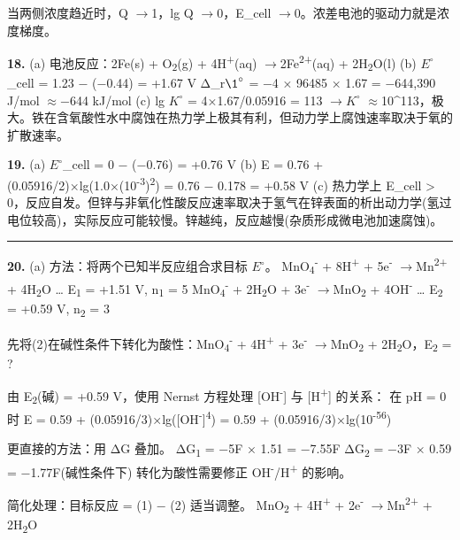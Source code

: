 \documentclass[a4paper,11pt]{ctexart}
\newcommand{\箭}{\ensuremath{\rightarrow}}
\newcommand{\左箭}{\ensuremath{\leftarrow}}
\newcommand{\上箭}{\ensuremath{\uparrow}}
\newcommand{\下箭}{\ensuremath{\downarrow}}
\newcommand{\衡}{\ensuremath{\rightleftharpoons}}
\newcommand{\双箭}{\ensuremath{\leftrightarrow}}
\newcommand{\约等于}{\ensuremath{\approx}}
\newcommand{\小于等于}{\ensuremath{\leq}}
\newcommand{\大于等于}{\ensuremath{\geq}}
\newcommand{\不等于}{\ensuremath{\neq}}
\newcommand{\西格马}{\ensuremath{\sigma}}
\newcommand{\派}{\ensuremath{\pi}}
\begin{document}
当两侧浓度趋近时，Q \箭 1，lg Q \箭 0，E\_cell \箭 0。浓差电池的驱动力就是浓度梯度。

\textbf{18.}
(a) 电池反应：2Fe(s) + O\textsubscript{2}(g) + 4H\textsuperscript{+}(aq) \箭 2Fe\textsuperscript{2+}(aq) + 2H\textsubscript{2}O(l)
(b) \(E^{\circ}\)\_cell = 1.23 − (−0.44) = +1.67 V
Δ\_r\(\1^{\circ}\) = −4 × 96485 × 1.67 = −644,390 J/mol \约等于 −644 kJ/mol
(c) lg \(K^{\circ}\) = 4×1.67/0.05916 = 113 \箭 \(K^{\circ}\) \约等于 10\^{}113，极大。铁在含氧酸性水中腐蚀在热力学上极其有利，但动力学上腐蚀速率取决于氧的扩散速率。

\textbf{19.}
(a) \(E^{\circ}\)\_cell = 0 − (−0.76) = +0.76 V
(b) E = 0.76 + (0.05916/2)×lg(1.0×(10\textsuperscript{-3})\textsuperscript{2}) = 0.76 − 0.178 = +0.58 V
(c) 热力学上 E\_cell \textgreater{} 0，反应自发。但锌与非氧化性酸反应速率取决于氢气在锌表面的析出动力学(氢过电位较高)，实际反应可能较慢。锌越纯，反应越慢(杂质形成微电池加速腐蚀)。

\begin{center}\rule{0.5\linewidth}{0.5pt}\end{center}

\textbf{20.}
(a) 方法：将两个已知半反应组合求目标 \(E^{\circ}\)。
MnO\textsubscript{4}\textsuperscript{-} + 8H\textsuperscript{+} + 5e\textsuperscript{-} \箭 Mn\textsuperscript{2+} + 4H\textsubscript{2}O \ldots{} E\textsubscript{1} = +1.51 V, n\textsubscript{1} = 5
MnO\textsubscript{4}\textsuperscript{-} + 2H\textsubscript{2}O + 3e\textsuperscript{-} \箭 MnO\textsubscript{2} + 4OH\textsuperscript{-} \ldots{} E\textsubscript{2} = +0.59 V, n\textsubscript{2} = 3

先将(2)在碱性条件下转化为酸性：MnO\textsubscript{4}\textsuperscript{-} + 4H\textsuperscript{+} + 3e\textsuperscript{-} \箭 MnO\textsubscript{2} + 2H\textsubscript{2}O，E\textsubscript{2} = ?

由 E\textsubscript{2}(碱) = +0.59 V，使用 Nernst 方程处理 {[}OH\textsuperscript{-}{]} 与 {[}H\textsuperscript{+}{]} 的关系：
在 pH = 0 时 E = 0.59 + (0.05916/3)×lg({[}OH\textsuperscript{-}{]}\textsuperscript{4}) = 0.59 + (0.05916/3)×lg(10\textsuperscript{-56})

更直接的方法：用 ΔG 叠加。
ΔG\textsubscript{1} = −5F × 1.51 = −7.55F
ΔG\textsubscript{2} = −3F × 0.59 = −1.77F(碱性条件下)
转化为酸性需要修正 OH\textsuperscript{-}/H\textsuperscript{+} 的影响。

简化处理：目标反应 = (1) − (2) 适当调整。
MnO\textsubscript{2} + 4H\textsuperscript{+} + 2e\textsuperscript{-} \箭 Mn\textsuperscript{2+} + 2H\textsubscript{2}O
\end{document}
